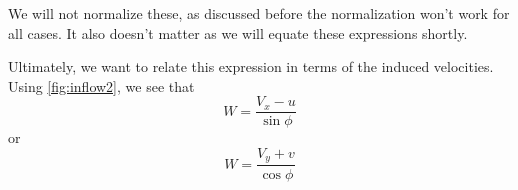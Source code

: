\documentclass{article}
\begin{document}
We will not normalize these, as discussed before the normalization won't work for all cases.  It also doesn't matter as we will equate these expressions shortly.


Ultimately, we want to relate this expression in terms of the induced velocities.  Using \cref{fig:inflow2}, we see that
\begin{equation}
    W = \frac{V_x  - u}{\sin \phi}
\end{equation}
or
\begin{equation}
    W = \frac{V_y + v}{\cos \phi}
\end{equation}

\end{document}
